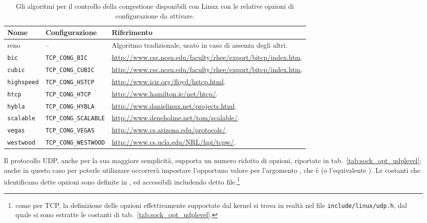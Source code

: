 \begin{basedescript}{\desclabelwidth{1.5cm}\desclabelstyle{\nextlinelabel}}
  \begin{table}[!htb]
    \centering
    \footnotesize
    \begin{tabular}[c]{|l|l|l|}
      \hline
      \textbf{Nome}&\textbf{Configurazione}&\textbf{Riferimento} \\
      \hline
      \hline
      reno& -- &Algoritmo tradizionale, usato in caso di assenza degli altri.\\
      \texttt{bic}     &\texttt{TCP\_CONG\_BIC}     & 
      \url{http://www.csc.ncsu.edu/faculty/rhee/export/bitcp/index.htm}.\\
      \texttt{cubic}   &\texttt{TCP\_CONG\_CUBIC}     & 
      \url{http://www.csc.ncsu.edu/faculty/rhee/export/bitcp/index.htm}.\\
      \texttt{highspeed}&\texttt{TCP\_CONG\_HSTCP}  & 
      \url{http://www.icir.org/floyd/hstcp.html}.\\
      \texttt{htcp}    &\texttt{TCP\_CONG\_HTCP}    & 
      \url{http://www.hamilton.ie/net/htcp/}.\\
      \texttt{hybla}   &\texttt{TCP\_CONG\_HYBLA}   &       
      \url{http://www.danielinux.net/projects.html}.\\
      \texttt{scalable}&\texttt{TCP\_CONG\_SCALABLE}&  
      \url{http://www.deneholme.net/tom/scalable/}.\\
      \texttt{vegas}   &\texttt{TCP\_CONG\_VEGAS}   &  
      \url{http://www.cs.arizona.edu/protocols/}.\\
      \texttt{westwood}&\texttt{TCP\_CONG\_WESTWOOD}& 
      \url{http://www.cs.ucla.edu/NRL/hpi/tcpw/}.\\
      \hline
    \end{tabular}
    \caption{Gli algoritmi per il controllo della congestione disponibili con
      Linux con le relative opzioni di configurazione da attivare.}  
    \label{tab:sock_tcp_congestion_algo}
  \end{table}

\end{basedescript}


Il protocollo UDP, anche per la sua maggiore semplicità, supporta un numero
ridotto di opzioni, riportate in tab.~\ref{tab:sock_opt_udplevel}; anche in
questo caso per poterle utilizzare occorrerà impostare l'opportuno valore per
l'argomento , che è  (o l'equivalente
).  Le costanti che identificano dette opzioni sono
definite in , ed accessibili includendo detto
file.\footnote{come per TCP, la definizione delle opzioni effettivamente
  supportate dal kernel si trova in realtà nel file
  \texttt{include/linux/udp.h}, dal quale si sono estratte le costanti di
  tab.~\ref{tab:sock_opt_udplevel}.}

